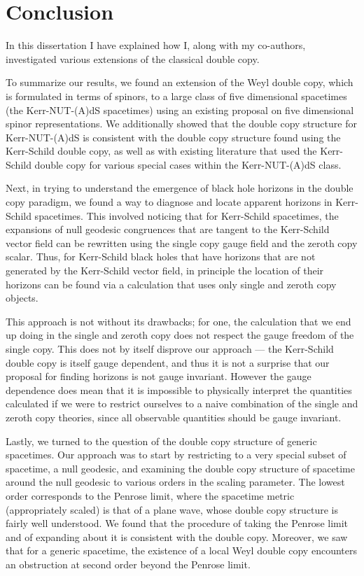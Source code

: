 \chapter{Conclusion}

In this dissertation I have explained how I, along with my co-authors, investigated various extensions of the
classical double copy.

To summarize our results, we found an extension of the Weyl double copy, which is formulated in terms of spinors,
to a large class of five dimensional spacetimes (the Kerr-NUT-(A)dS spacetimes) using an existing proposal on five
dimensional spinor representations. We additionally showed that the double copy structure for Kerr-NUT-(A)dS is
consistent with the double copy structure found using the Kerr-Schild double copy, as well as with existing
literature that used the Kerr-Schild double copy for various special cases within the Kerr-NUT-(A)dS class.

Next, in trying to understand the emergence of black hole horizons in the double copy paradigm, we found a way to
diagnose and locate apparent horizons in Kerr-Schild spacetimes. This involved noticing that for Kerr-Schild
spacetimes, the expansions of null geodesic congruences that are tangent to the Kerr-Schild vector field can be
rewritten using the single copy gauge field and the zeroth copy scalar. Thus, for Kerr-Schild black holes that have
horizons that are not generated by the Kerr-Schild vector field, in principle the location of their horizons can be
found via a calculation that uses only single and zeroth copy objects.

This approach is not without its drawbacks; for one, the calculation that we end up doing in the single and zeroth
copy does not respect the gauge freedom of the single copy. This does not by itself disprove our approach --- the
Kerr-Schild double copy is itself gauge dependent, and thus it is not a surprise that our proposal for finding
horizons is not gauge invariant. However the gauge dependence does mean that it is impossible to physically
interpret the quantities calculated if we were to restrict ourselves to a naive combination of the single and
zeroth copy theories, since all observable quantities should be gauge invariant.

Lastly, we turned to the question of the double copy structure of generic spacetimes. Our approach was to start
by restricting to a very special subset of spacetime, a null geodesic, and examining the double copy structure of
spacetime around the null geodesic to various orders in the scaling parameter. The lowest order corresponds to the
Penrose limit, where the spacetime metric (appropriately scaled) is that of a plane wave, whose double copy
structure is fairly well understood. We found that the procedure of taking the Penrose limit and of expanding about
it is consistent with the double copy. Moreover, we saw that for a generic spacetime, the existence of a local Weyl
double copy encounters an obstruction at second order beyond the Penrose limit.
